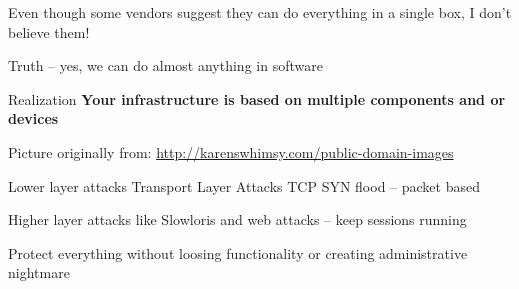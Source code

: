\documentclass[Screen16to9,17pt]{foils}
\begin{document}


\begin{list2}
\item Even though some vendors suggest they can do everything in a single box, I don't believe them!
\item Truth -- yes, we can do almost anything in software
\item Realization {\bf Your infrastructure is based on multiple components and or devices}
\end{list2}


{\hfill \small Picture originally from: \url{http://karenswhimsy.com/public-domain-images}}



%






\begin{list2}
\item Lower layer attacks Transport Layer Attacks TCP SYN flood -- packet based
\item Higher layer attacks like Slowloris and web attacks -- keep sessions running
\item Protect everything without loosing functionality or creating administrative nightmare
\end{list2}

\end{document}
